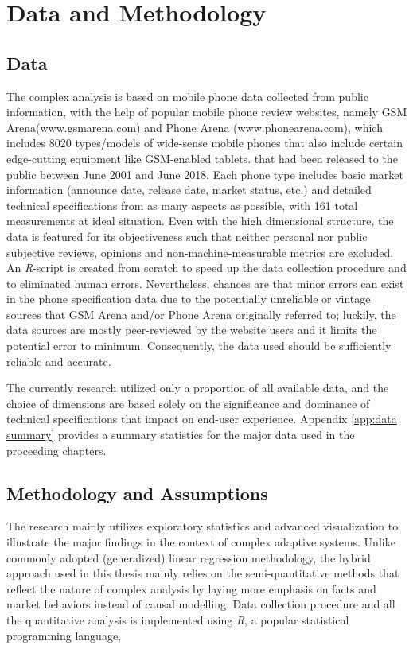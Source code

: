\documentclass[utf8,english]{gradu3}
\begin{document}
\chapter{Data and Methodology}

\section{Data}

The complex analysis is based on mobile phone data collected from public information, with the help of popular mobile phone review websites, namely GSM Arena(www.gsmarena.com) and Phone Arena (www.phonearena.com), which includes 8020 types/models of wide-sense mobile phones that also include certain edge-cutting equipment like GSM-enabled tablets. that had been released to the public between June 2001 and June 2018. Each phone type includes basic market information (announce date, release date, market status, etc.) and detailed technical specifications from as many aspects as possible, with 161 total measurements at ideal situation. Even with the high dimensional structure, the data is featured for its objectiveness such that neither personal nor public subjective reviews, opinions and non-machine-measurable metrics are excluded. An \textit{R}-script is created from scratch to speed up the data collection procedure and to eliminated human errors. Nevertheless, chances are that minor errors can exist in the phone specification data due to the potentially unreliable or vintage sources that GSM Arena and/or Phone Arena originally referred to; luckily, the data sources are mostly peer-reviewed by the website users and it limits the potential error to minimum. Consequently, the data used should be sufficiently reliable and accurate.

The currently research utilized only a proportion of all available data, and the choice of dimensions are based solely on the significance and dominance of technical specifications that impact on end-user experience. Appendix \ref{app:data summary} provides a summary statistics for the major data used in the proceeding chapters.

\section{Methodology and Assumptions}

The research mainly utilizes exploratory statistics and advanced visualization to illustrate the major findings in the context of complex adaptive systems. Unlike commonly adopted (generalized) linear regression methodology, the hybrid approach used in this thesis mainly relies on the semi-quantitative methods that reflect the nature of complex analysis by laying more emphasis on facts and market behaviors instead of causal modelling. Data collection procedure and all the quantitative analysis is implemented using \textit{R}, a popular statistical programming language, 
\end{document}
